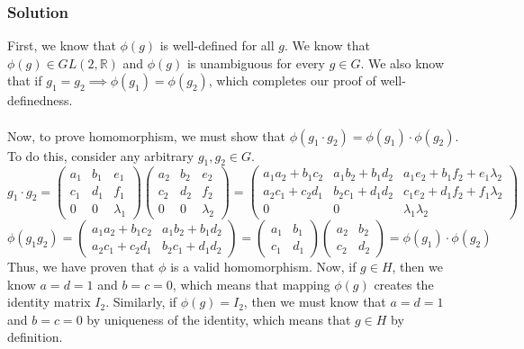 \subsubsection{Solution}
First, we know that $\phi(g)$ is well-defined for all $g$. We know that $\phi(g) \in GL(2,\mathbb{R})$ and $\phi(g)$ is unambiguous for every $g \in G$. We also know that if $g_1 = g_2 \implies \phi(g_1) = \phi(g_2)$, which completes our proof of well-definedness. \\
\\
Now, to prove homomorphism, we must show that $\phi(g_1 \cdot g_2) = \phi(g_1) \cdot \phi(g_2)$. To do this, consider any arbitrary $g_1, g_2 \in G$.
$$
g_1 \cdot g_2 = \begin{pmatrix}
    a_1 & b_1 & e_1\\
    c_1 & d_1 & f_1\\
    0 & 0 & \lambda_1
\end{pmatrix}
\begin{pmatrix}
    a_2 & b_2 & e_2\\
    c_2 & d_2 & f_2\\
    0 & 0 & \lambda_2
\end{pmatrix} = \begin{pmatrix}
    a_1a_2 + b_1c_2 & a_1b_2 + b_1d_2 & a_1e_2 + b_1f_2 + e_1\lambda_2\\
    a_2c_1 + c_2d_1 & b_2c_1+ d_1d_2 & c_1e_2 + d_1f_2 + f_1\lambda_2 \\
    0 & 0 & \lambda_1 \lambda_2
\end{pmatrix}
$$
$$
\phi(g_1g_2) = \begin{pmatrix}
    a_1a_2 + b_1c_2 & a_1b_2 + b_1d_2 \\
    a_2c_1 + c_2d_1 & b_2c_1+ d_1d_2 
\end{pmatrix} = \begin{pmatrix}
    a_1 & b_1 \\
    c_1 & d_1 
\end{pmatrix} \begin{pmatrix}
    a_2 & b_2 \\
    c_2 & d_2 
\end{pmatrix} = \phi(g_1) \cdot \phi(g_2)
$$
Thus, we have proven that $\phi$ is a valid homomorphism. Now, if $g \in H$, then we know $a = d = 1$ and $b = c = 0$, which means that mapping $\phi(g)$ creates the identity matrix $I_2$. Similarly, if $\phi(g) = I_2$, then we must know that $a = d = 1$ and $b = c = 0$ by uniqueness of the identity, which means that $g \in H$ by definition.